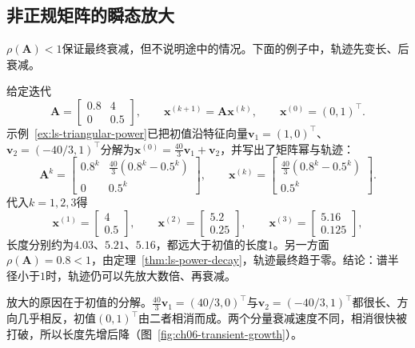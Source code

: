 \subsection{非正规矩阵的瞬态放大}

$\rho(\bm A)<1$保证最终衰减，但不说明途中的情况。下面的例子中，轨迹先变长、后衰减。
\begin{example}[非正规矩阵的瞬态放大]
\label{ex:ls-transient-growth}
给定迭代
\begin{equation}
 \bm A=\begin{bmatrix}0.8&4\\0&0.5\end{bmatrix},\qquad
 \bm x^{(k+1)}=\bm A\bm x^{(k)},\qquad \bm x^{(0)}=(0,1)^{\top}.
 \label{eq:ch06-fixed-iteration-example}
\end{equation}
示例~\ref{ex:ls-triangular-power}已把初值沿特征向量$\bm v_1=(1,0)^{\top}$、$\bm v_2=(-40/3,1)^{\top}$分解为$\bm x^{(0)}=\tfrac{40}{3}\bm v_1+\bm v_2$，并写出了矩阵幂与轨迹：
\begin{equation}
 \bm A^k=
 \begin{bmatrix}
  0.8^k&\frac{40}{3}(0.8^k-0.5^k)\\
  0&0.5^k
 \end{bmatrix},\qquad
 \bm x^{(k)}=
 \begin{bmatrix}\frac{40}{3}(0.8^k-0.5^k)\\0.5^k\end{bmatrix}.
 \label{eq:ch06-diagonalizable-finite-trajectory}
\end{equation}
代入$k=1,2,3$得
\[
 \bm x^{(1)}=\begin{bmatrix}4\\0.5\end{bmatrix},\qquad
 \bm x^{(2)}=\begin{bmatrix}5.2\\0.25\end{bmatrix},\qquad
 \bm x^{(3)}=\begin{bmatrix}5.16\\0.125\end{bmatrix},
\]
长度分别约为$4.03$、$5.21$、$5.16$，都远大于初值的长度$1$。另一方面$\rho(\bm A)=0.8<1$，由定理~\ref{thm:ls-power-decay}，轨迹最终趋于零。结论：谱半径小于$1$时，轨迹仍可以先放大数倍、再衰减。
\end{example}
放大的原因在于初值的分解。$\tfrac{40}{3}\bm v_1=(40/3,0)^\top$与$\bm v_2=(-40/3,1)^\top$都很长、方向几乎相反，初值$(0,1)^\top$由二者相消而成。两个分量衰减速度不同，相消很快被打破，所以长度先增后降（图~\ref{fig:ch06-transient-growth}）。

